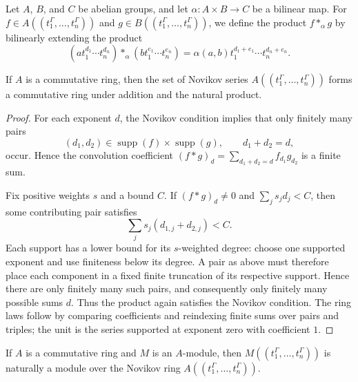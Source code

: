 \begin{definition}
  \label{def:novikov_multiplication}
  \leanok
  Let $A$, $B$, and $C$ be abelian groups, and let
  $\alpha\colon A\times B\to C$ be a bilinear map. For
  $f\in A((t_1^\Gamma,\dotsc,t_n^\Gamma))$ and
  $g\in B((t_1^\Gamma,\dotsc,t_n^\Gamma))$, we define the product
  $f\ast_\alpha g$ by
  bilinearly extending the product
  \[ (a t_1^{d_1} \dotsm t_n^{d_n}) \ast_\alpha (b t_1^{e_1} \dotsm t_n^{e_n})
  = \alpha(a, b) t_1^{d_1+e_1} \dotsm t_n^{d_n+e_n}. \]
\end{definition}

\begin{theorem}
  \label{thm:novikov_ring}
  \leanok
  If $A$ is a commutative ring, then the set of Novikov series $A((t_1^\Gamma,
  \dotsc, t_n^\Gamma))$ forms a commutative ring under addition and the
  natural product.
\end{theorem}

\begin{proof}
  \leanok
  For each exponent $d$, the Novikov condition implies that only finitely many
  pairs
  \[
    (d_1,d_2)\in\operatorname{supp}(f)\times\operatorname{supp}(g),
    \qquad d_1+d_2=d,
  \]
  occur.  Hence the convolution coefficient
  $(f*g)_d=\sum_{d_1+d_2=d}f_{d_1}g_{d_2}$ is a finite sum.

  Fix positive weights $s$ and a bound $C$.  If $(f*g)_d\ne0$ and
  $\sum_j s_jd_j<C$, then some contributing pair satisfies
  \[
    \sum_j s_j(d_{1,j}+d_{2,j})<C.
  \]
  Each support has a lower bound for its $s$-weighted degree: choose one
  supported exponent and use finiteness below its degree.  A pair as above
  must therefore place each component in a fixed finite truncation of its
  respective support.  Hence there are only finitely many such pairs, and
  consequently only finitely many possible sums $d$.  Thus the product again
  satisfies the Novikov condition.  The ring laws follow by
  comparing coefficients and reindexing finite sums over pairs and triples;
  the unit is the series supported at exponent zero with coefficient $1$.
\end{proof}

\begin{theorem}
  \label{thm:novikov_module}
  \leanok
  If $A$ is a commutative ring and $M$ is an $A$-module, then $M((t_1^\Gamma,
  \dotsc, t_n^\Gamma))$ is naturally a module over the Novikov ring
  $A((t_1^\Gamma, \dotsc, t_n^\Gamma))$.
\end{theorem}

